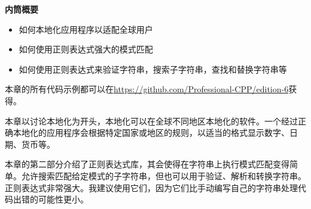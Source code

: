 \noindent
\textbf{内筒概要}

\begin{itemize}
\item
如何本地化应用程序以适配全球用户

\item
如何使用正则表达式强大的模式匹配

\item
如何使用正则表达式来验证字符串，搜索子字符串，查找和替换字符串等
\end{itemize}

本章的所有代码示例都可以在\url{https://github.com/Professional-CPP/edition-6}获得。

本章以讨论本地化为开头，本地化可以在全球不同地区本地化的软件。一个经过正确本地化的应用程序会根据特定国家或地区的规则，以适当的格式显示数字、日期、货币等。

本章的第二部分介绍了正则表达式库，其会使得在字符串上执行模式匹配变得简单。允许搜索匹配给定模式的子字符串，但也可以用于验证、解析和转换字符串。正则表达式非常强大。我建议使用它们，因为它们比手动编写自己的字符串处理代码出错的可能性更小。
